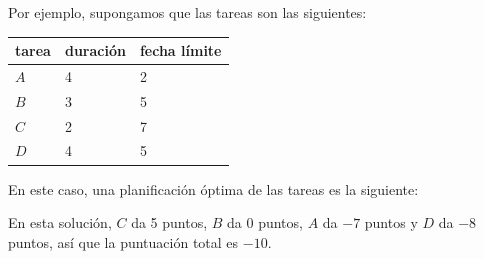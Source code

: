 Por ejemplo, supongamos que las tareas son las siguientes:
\begin{center}
\begin{tabular}{lll}
tarea & duración & fecha límite \\
\hline
$A$ & 4 & 2 \\
$B$ & 3 & 5 \\
$C$ & 2 & 7 \\
$D$ & 4 & 5 \\
\end{tabular}
\end{center}
En este caso, una planificación óptima de las tareas
es la siguiente:
\begin{center}
\end{center}
En esta solución, $C$ da 5 puntos,
$B$ da 0 puntos, $A$ da $-7$ puntos
y $D$ da $-8$ puntos,
así que la puntuación total es $-10$.

